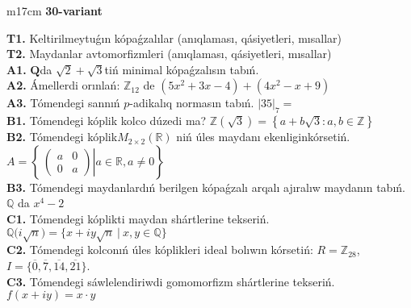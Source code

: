 \documentclass{article}
\begin{document}
\begin{tabular}{m{17cm}}
\textbf{30-variant}
\newline

\textbf{T1.} Keltirilmeytuǵın kópaǵzalılar (anıqlaması, qásiyetleri, mısallar) \\
\textbf{T2.} Maydanlar avtomorfizmleri (anıqlaması, qásiyetleri, mısallar) \\
\textbf{A1.} \(\mathbf{Q}\)da \(\sqrt{2} + \sqrt{3}\)tiń minimal kópaǵzalısın tabıń. \\
\textbf{A2.} Ámellerdi orınlań: \(\mathbb{Z}_{12}\) de \(\left( 5x^{2} + 3x - 4 \right) + \left( 4x^{2} - x + 9 \right)\) \\
\textbf{A3.} Tómendegi sannıń \(p\)-adikalıq normasın tabıń. \(|35|_{7} =\) \\
\textbf{B1.} Tómendegi kóplik kolco dúzedi ma? \(\mathbb{Z}\left( \sqrt{3} \right) = \left\{ a + b\sqrt{3}:a,b \in \mathbb{Z} \right\}\) \\
\textbf{B2.} Tómendegi kóplik\(M_{2 \times 2}\left( \mathbb{R} \right)\) niń úles maydanı ekenliginkórsetiń. \(A = \left\{ \left. \ \begin{pmatrix}
a & 0 \\
0 & a
\end{pmatrix} \right|a\mathbb{\in R},a \neq 0 \right\}\) \\
\textbf{B3.} Tómendegi maydanlardıń berilgen kópaǵzalı arqalı ajıralıw maydanın tabıń. \(\mathbb{Q}\) da \(x^{4} - 2\) \\
\textbf{C1.} Tómendegi kóplikti maydan shártlerine tekseriń. \(\mathbb{Q(}i\sqrt{n}) = \{ x + iy\sqrt{n}\ |\ x,y \in \mathbb{Q}\}\) \\
\textbf{C2.} Tómendegi kolconıń úles kóplikleri ideal bolıwın kórsetiń:
\(R = \mathbb{Z}_{28}\), \(I = \{\overline{0},\overline{7},\overline{14},\overline{21}\}\). \\
\textbf{C3.} Tómendegi sáwlelendiriwdi gomomorfizm shártlerine tekseriń. \(f(x + iy) = x \cdot y\) \\

\end{tabular}
\vspace{1cm}
\end{document}
